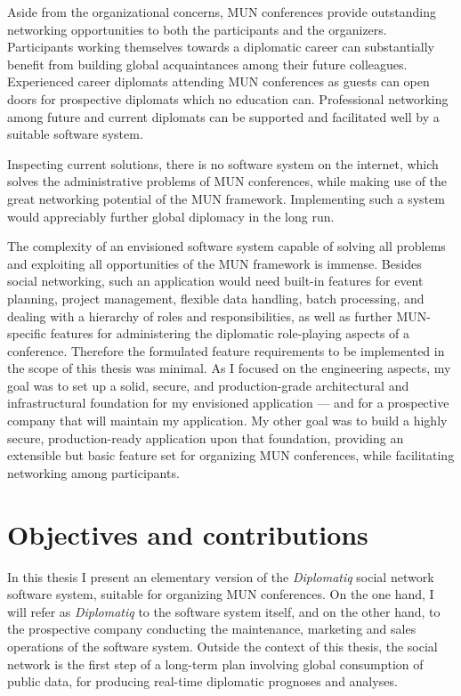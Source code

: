 Aside from the organizational concerns, MUN conferences provide outstanding networking opportunities to both the participants and the organizers. Participants working themselves towards a diplomatic career can substantially benefit from building global acquaintances among their future colleagues. Experienced career diplomats attending MUN conferences as guests can open doors for prospective diplomats which no education can. Professional networking among future and current diplomats can be supported and facilitated well by a suitable software system.

Inspecting current solutions, there is no software system on the internet, which solves the administrative problems of MUN conferences, while making use of the great networking potential of the MUN framework. Implementing such a system would appreciably further global diplomacy in the long run.

The complexity of an envisioned software system capable of solving all problems and exploiting all opportunities of the MUN framework is immense. Besides social networking, such an application would need built-in features for event planning, project management, flexible data handling, batch processing, and dealing with a hierarchy of roles and responsibilities, as well as further MUN-specific features for administering the diplomatic role-playing aspects of a conference. Therefore the formulated feature requirements to be implemented in the scope of this thesis was minimal. As I focused on the engineering aspects, my goal was to set up a solid, secure, and production-grade architectural and infrastructural foundation for my envisioned application — and for a prospective company that will maintain my application. My other goal was to build a highly secure, production-ready application upon that foundation, providing an extensible but basic feature set for organizing MUN conferences, while facilitating networking among participants.

\section{Objectives and contributions}

In this thesis I present an elementary version of the \emph{Diplomatiq} social network software system, suitable for organizing MUN conferences. On the one hand, I will refer as \emph{Diplomatiq} to the software system itself, and on the other hand, to the prospective company conducting the maintenance, marketing and sales operations of the software system. Outside the context of this thesis, the social network is the first step of a long-term plan involving global consumption of public data, for producing real-time diplomatic prognoses and analyses.

